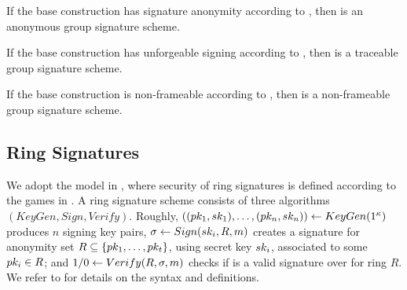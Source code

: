 \begin{theorem}
  If the base \CUASGen construction has signature anonymity according to
  , then \CUASGS is an anonymous group signature
  scheme.
\end{theorem}

\begin{theorem}
  If the base \CUASGen construction has unforgeable signing according to
  , then \CUASGS is a traceable group signature
  scheme.
\end{theorem}

\begin{theorem}
  If the base \CUASGen construction is non-frameable according to
  , then \CUASGS is a non-frameable group signature
  scheme.
\end{theorem}

\subsection{Ring Signatures}
\label{ssec:related-models-rs}

We adopt the model in \cite{bkm06}, where security of ring signatures is
defined according to the games in . A ring signature
scheme consists of three algorithms $(KeyGen,Sign,Verify)$. Roughly,
$((pk_1,sk_1),\dots,(pk_n,sk_n)) \gets KeyGen(1^\kappa)$ produces $n$
signing key pairs, $\sigma \gets Sign(sk_i,R,m)$ creates a signature for
anonymity set $R \subseteq \lbrace pk_1, \dots, pk_t \rbrace$, using secret
key $sk_i$, associated to some $pk_i \in R$; and $1/0 \gets Verify(R,\sigma,
m)$ checks if \sig is a valid signature over \msg for ring $R$. We refer
to \cite{bkm06} for details on the syntax and definitions.

